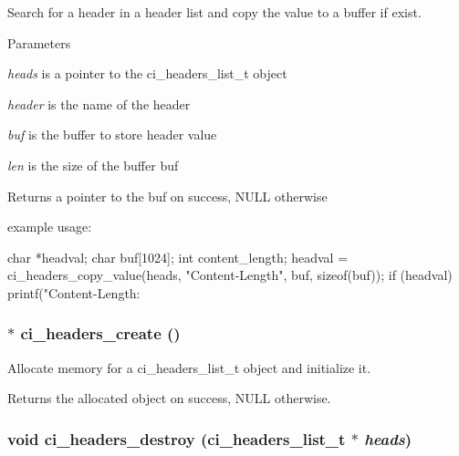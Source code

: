Search for a header in a header list and copy the value to a buffer if exist. 
\begin{DoxyParams}{Parameters}
\item[{\em heads}]is a pointer to the ci\_\-headers\_\-list\_\-t object \item[{\em header}]is the name of the header \item[{\em buf}]is the buffer to store header value \item[{\em len}]is the size of the buffer buf \end{DoxyParams}
\begin{DoxyReturn}{Returns}
a pointer to the buf on success, NULL otherwise
\end{DoxyReturn}
example usage: 
\begin{DoxyCode}
 char *headval;
 char buf[1024];
 int content_length;
 headval = ci_headers_copy_value(heads, "Content-Length", buf, sizeof(buf));
 if (headval)
     printf("Content-Length: %
\end{DoxyCode}
 \hypertarget{group__HEADERS_ga7c5cc5d09bd83eb7ecc882ed200e6096}{
\subsubsection[{ci\_\-headers\_\-create}]{$\ast$ ci\_\-headers\_\-create ()}}
\label{group__HEADERS_ga7c5cc5d09bd83eb7ecc882ed200e6096}


Allocate memory for a ci\_\-headers\_\-list\_\-t object and initialize it. \begin{DoxyReturn}{Returns}
the allocated object on success, NULL otherwise. 
\end{DoxyReturn}
\hypertarget{group__HEADERS_ga3196c0d95e2dff1af839d657a83c1788}{
\subsubsection[{ci\_\-headers\_\-destroy}]{\setlength{\rightskip}{0pt plus 5cm}void ci\_\-headers\_\-destroy ({\bf ci\_\-headers\_\-list\_\-t} $\ast$ {\em heads})}}
\label{group__HEADERS_ga3196c0d95e2dff1af839d657a83c1788}


